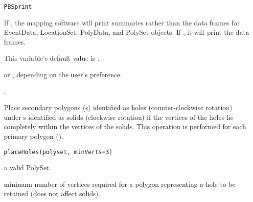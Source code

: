 \documentclass[letterpaper]{book}
\begin{document}
%
\begin{Usage}
\begin{verbatim}
PBSprint
\end{verbatim}
\end{Usage}
%
\begin{Details}\relax
If , the mapping software will print summaries
rather than the data frames for EventData, LocationSet, PolyData, and
PolySet objects.  If , it will print the data
frames.

This variable's default value is .
\end{Details}
%
\begin{Value}
 or , depending on the user's preference.
\end{Value}
%
\begin{SeeAlso}\relax
{}.
\end{SeeAlso}
%
\begin{Description}\relax
Place secondary polygons (s) identified as holes 
(counter-clockwise rotation) under s identified as 
solids (clockwise rotation) if the vertices of the holes lie 
completely within the vertices of the solids. 
This operation is performed for each primary polygon ().
\end{Description}
%
\begin{Usage}
\begin{verbatim}
placeHoles(polyset, minVerts=3)
\end{verbatim}
\end{Usage}
%
\begin{Arguments}
\begin{ldescription}
\item[\code{polyset}] a valid  PolySet.
\item[\code{minVerts}] minimum number of vertices required for a polygon 
representing a hole to be retained (does not affect solids).
\end{ldescription}
\end{Arguments}
%
\end{document}
